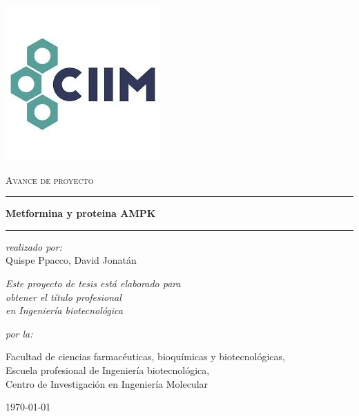 \documentclass[a4paper,11pt,openany]{book}
\numberwithin{equation}{section}
\begin{document}

\begin{titlepage}
\begin{center}


\includegraphics[scale=0.35]{logo.jpg}



\textsc{\Large Avance de proyecto } \vspace{0.5cm} %


\rule{14cm}{0.05cm} \vspace{0.4cm} %


\Large{\textbf{Metformina y proteina AMPK }}\vspace{0.4cm} %

\rule{14cm}{0.05cm} \vspace{1.5cm} %
 
\large{\textit{realizado por:}} \\
\Large{Quispe Ppacco, David Jonatán}  %

\vspace{1cm}

\large \textit{
Este proyecto de tesis está elaborado para\\ 
obtener el título profesional\\
en Ingeniería biotecnológica} 

\vspace{2cm} %

\textit{por la:}

\vspace{0.4cm}

Facultad de ciencias farmacéuticas, bioquímicas y biotecnológicas,\\ 
Escuela profesional de Ingeniería biotecnológica,\\ 
Centro de Investigación en Ingeniería Molecular

\vspace{1.0cm} 

\today
 
\end{center}
\end{titlepage}
\end{document}

